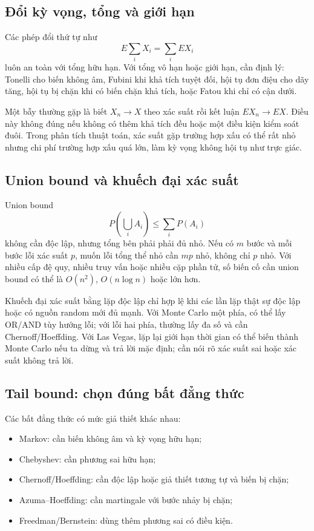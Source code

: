 \documentclass[11pt]{article}
\begin{document}
\subsection{Đổi kỳ vọng, tổng và giới hạn}

Các phép đổi thứ tự như
\[
  E\sum_i X_i=\sum_i E X_i
\]
luôn an toàn với tổng hữu hạn. Với tổng vô hạn hoặc giới hạn, cần định lý:
Tonelli cho biến không âm, Fubini khi khả tích tuyệt đối, hội tụ đơn điệu cho
dãy tăng, hội tụ bị chặn khi có biến chặn khả tích, hoặc Fatou khi chỉ có cận
dưới.

Một bẫy thường gặp là biết \(X_n\to X\) theo xác suất rồi kết luận
\(E X_n\to E X\). Điều này không đúng nếu không có thêm khả tích đều hoặc một
điều kiện kiểm soát đuôi. Trong phân tích thuật toán, xác suất gặp trường hợp
xấu có thể rất nhỏ nhưng chi phí trường hợp xấu quá lớn, làm kỳ vọng không hội
tụ như trực giác.

\subsection{Union bound và khuếch đại xác suất}

Union bound
\[
  P\left(\bigcup_i A_i\right)\le\sum_i P(A_i)
\]
không cần độc lập, nhưng tổng bên phải phải đủ nhỏ. Nếu có \(m\) bước và mỗi
bước lỗi xác suất \(p\), muốn lỗi tổng thể nhỏ cần \(mp\) nhỏ, không chỉ \(p\)
nhỏ. Với nhiều cấp đệ quy, nhiều truy vấn hoặc nhiều cặp phần tử, số biến cố
cần union bound có thể là \(O(n^2)\), \(O(n\log n)\) hoặc lớn hơn.

Khuếch đại xác suất bằng lặp độc lập chỉ hợp lệ khi các lần lặp thật sự độc lập
hoặc có nguồn random mới đủ mạnh. Với Monte Carlo một phía, có thể lấy OR/AND
tùy hướng lỗi; với lỗi hai phía, thường lấy đa số và cần Chernoff/Hoeffding.
Với Las Vegas, lặp lại giới hạn thời gian có thể biến thành Monte Carlo nếu ta
dừng và trả lời mặc định; cần nói rõ xác suất sai hoặc xác suất không trả lời.

\subsection{Tail bound: chọn đúng bất đẳng thức}

Các bất đẳng thức có mức giả thiết khác nhau:
\begin{itemize}
  \item Markov: cần biến không âm và kỳ vọng hữu hạn;
  \item Chebyshev: cần phương sai hữu hạn;
  \item Chernoff/Hoeffding: cần độc lập hoặc giả thiết tương tự và biến bị chặn;
  \item Azuma--Hoeffding: cần martingale với bước nhảy bị chặn;
  \item Freedman/Bernstein: dùng thêm phương sai có điều kiện.
\end{itemize}
\end{document}
